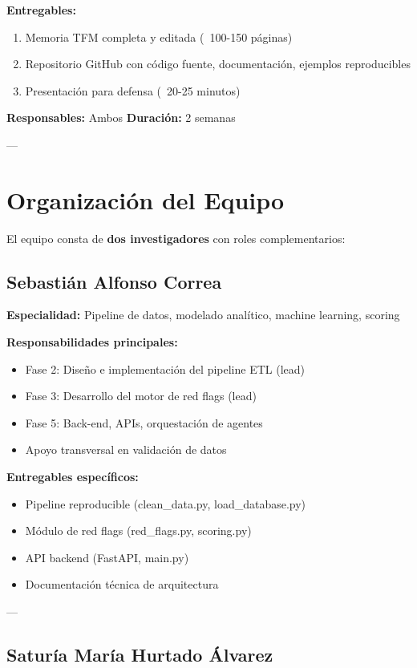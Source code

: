 \documentclass[11pt,a4paper,spanish]{book}
\numberwithin{equation}{chapter}
\numberwithin{figure}{chapter}
\begin{document}
\textbf{Entregables:}
\begin{enumerate}
\item Memoria TFM completa y editada (~100-150 páginas)
\item Repositorio GitHub con código fuente, documentación, ejemplos reproducibles
\item Presentación para defensa (~20-25 minutos)
\end{enumerate}

\textbf{Responsables:} Ambos
\textbf{Duración:} 2 semanas

---

\section{Organización del Equipo}

El equipo consta de \textbf{dos investigadores} con roles complementarios:

\subsection{Sebastián Alfonso Correa}

\textbf{Especialidad:} Pipeline de datos, modelado analítico, machine learning, scoring

\textbf{Responsabilidades principales:}
\begin{itemize}
\item Fase 2: Diseño e implementación del pipeline ETL (lead)
\item Fase 3: Desarrollo del motor de red flags (lead)
\item Fase 5: Back-end, APIs, orquestación de agentes
\item Apoyo transversal en validación de datos
\end{itemize}

\textbf{Entregables específicos:}
\begin{itemize}
\item Pipeline reproducible (clean\_data.py, load\_database.py)
\item Módulo de red flags (red\_flags.py, scoring.py)
\item API backend (FastAPI, main.py)
\item Documentación técnica de arquitectura
\end{itemize}

---

\subsection{Saturía María Hurtado Álvarez}
\end{document}
